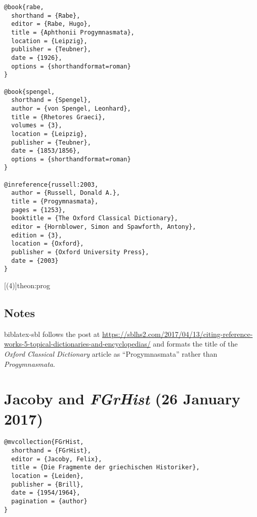 \documentclass[a4paper]{article}
\newcommand*{\pkg}[1]{\textsf{#1}}
\begin{document}
\begin{verbatim}
@book{rabe,
  shorthand = {Rabe},
  editor = {Rabe, Hugo},
  title = {Aphthonii Progymnasmata},
  location = {Leipzig},
  publisher = {Teubner},
  date = {1926},
  options = {shorthandformat=roman}
}

@book{spengel,
  shorthand = {Spengel},
  author = {von Spengel, Leonhard},
  title = {Rhetores Graeci},
  volumes = {3},
  location = {Leipzig},
  publisher = {Teubner},
  date = {1853/1856},
  options = {shorthandformat=roman}
}

@inreference{russell:2003,
  author = {Russell, Donald A.},
  title = {Progymnasmata},
  pages = {1253},
  booktitle = {The Oxford Classical Dictionary},
  editor = {Hornblower, Simon and Spawforth, Antony},
  edition = {3},
  location = {Oxford},
  publisher = {Oxford University Press},
  date = {2003}
}
\end{verbatim}

[(4)]{theon:prog}
\begin{verbcite}
  \nocite{gibson, kennedy:2003, patillonandbolognesi, rabe:1913, russell:2003}
\end{verbcite}
\exampleabbreviations
\examplebibliography

\subsection{Notes}

\pkg{biblatex-sbl} follows the post at
\url{https://sblhs2.com/2017/04/13/citing-reference-works-5-topical-dictionaries-and-encyclopedias/}
and formats the title of the \emph{Oxford Classical Dictionary} article as
“Progymnasmata” rather than \emph{Progymnasmata}.


\section{Jacoby and \emph{FGrHist} (26 January 2017)}

\begin{verbatim}
@mvcollection{FGrHist,
  shorthand = {FGrHist},
  editor = {Jacoby, Felix},
  title = {Die Fragmente der griechischen Historiker},
  location = {Leiden},
  publisher = {Brill},
  date = {1954/1964},
  pagination = {author}
}
\end{verbatim}
\end{document}
